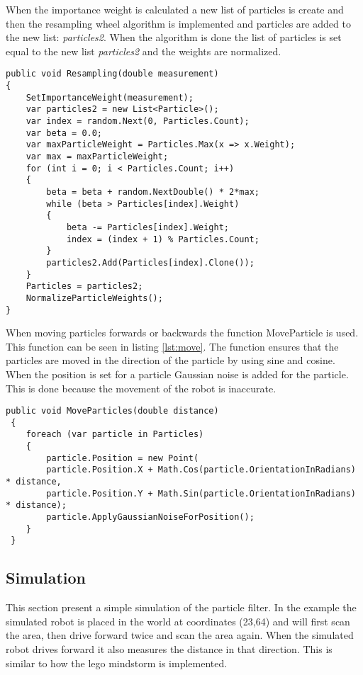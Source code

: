 When the importance weight is calculated a new list of particles is create and then the resampling wheel algorithm is implemented and particles are added to the new list: \emph{particles2}. When the algorithm is done the list of particles is set equal to the new list \emph{particles2} and the weights are normalized.

\lstset{style=sharpc}
\begin{lstlisting}[caption={Resampling wheel}, label=lst:wheel, mathescape=true]                          
public void Resampling(double measurement)
{
	SetImportanceWeight(measurement);
	var particles2 = new List<Particle>();
	var index = random.Next(0, Particles.Count);
	var beta = 0.0;
	var maxParticleWeight = Particles.Max(x => x.Weight);
	var max = maxParticleWeight;
	for (int i = 0; i < Particles.Count; i++)
	{
		beta = beta + random.NextDouble() * 2*max;
		while (beta > Particles[index].Weight)
		{
			beta -= Particles[index].Weight;
			index = (index + 1) % Particles.Count;
		}
		particles2.Add(Particles[index].Clone());
	}
	Particles = particles2;
	NormalizeParticleWeights();
}
\end{lstlisting}

When moving particles forwards or backwards the function MoveParticle is used. This function can be seen in listing \ref{lst:move}. The function ensures that the particles are moved in the direction of the particle by using sine and cosine. When the position is set for a particle Gaussian noise is added for the particle. This is done because the movement of the robot is inaccurate. 

\lstset{style=sharpc}
\begin{lstlisting}[caption={Resampling wheel}, label=lst:move,  basicstyle=\tiny, mathescape=true]        
public void MoveParticles(double distance)
 {
 	foreach (var particle in Particles)
 	{
 		particle.Position = new Point(
 		particle.Position.X + Math.Cos(particle.OrientationInRadians) * distance, 
 		particle.Position.Y + Math.Sin(particle.OrientationInRadians) * distance); 
 		particle.ApplyGaussianNoiseForPosition();
 	}
 }
\end{lstlisting}

\subsection{Simulation}
This section present a simple simulation of the particle filter. In the example the simulated robot is placed in the world at coordinates (23,64) and will first scan the area, then drive forward twice and scan the area again. When the simulated robot drives forward it also measures the distance in that direction. This is similar to how the lego mindstorm is implemented.

